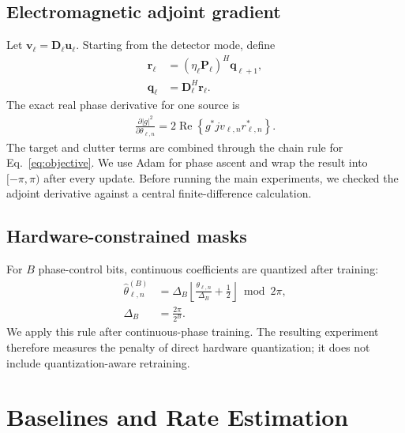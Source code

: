 \documentclass[pdflatex,sn-nature]{sn-jnl}
\newcommand{\vect}[1]{\bm{#1}}
\begin{document}
\subsection{Electromagnetic adjoint gradient}
Let $\vect v_\ell=\vect D_\ell\vect u_\ell$. Starting from the detector mode, define
\begin{equation}
\begin{aligned}
\vect r_\ell&=(\eta_\ell\vect P_\ell)^H\vect q_{\ell+1},\\
\vect q_\ell&=\vect D_\ell^H\vect r_\ell.
\end{aligned}
\end{equation}
The exact real phase derivative for one source is
\begin{equation}
\begin{aligned}
\frac{\partial |g|^2}{\partial\theta_{\ell,n}}
=2\operatorname{Re}\!\left\{g^*jv_{\ell,n}r_{\ell,n}^*\right\}.
\end{aligned}
\label{eq:gradient}
\end{equation}
The target and clutter terms are combined through the chain rule for
Eq.~\eqref{eq:objective}. We use Adam \cite{kingma2015adam} for phase ascent and wrap
the result into $[-\pi,\pi)$ after every update. Before running the main experiments,
we checked the adjoint derivative against a central finite-difference calculation.

\subsection{Hardware-constrained masks}
For $B$ phase-control bits, continuous coefficients are quantized after training:
\begin{equation}
\begin{aligned}
\widehat\theta_{\ell,n}^{(B)}&=\Delta_B
\left\lfloor\frac{\theta_{\ell,n}}{\Delta_B}+\frac12\right\rfloor
\bmod 2\pi,\\
\Delta_B&=\frac{2\pi}{2^B}.
\end{aligned}
\label{eq:quantization}
\end{equation}
We apply this rule after continuous-phase training. The resulting experiment therefore
measures the penalty of direct hardware quantization; it does not include
quantization-aware retraining.

\section{Baselines and Rate Estimation}
\end{document}
